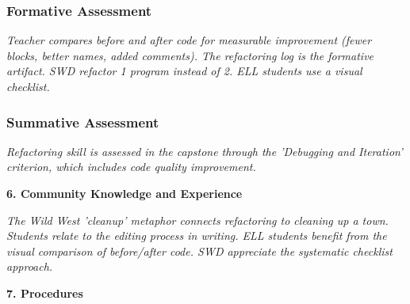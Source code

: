 \documentclass[11pt,letterpaper]{article}
\begin{document}
\subsubsection{Formative Assessment}

\textit{Teacher compares before and after code for measurable improvement (fewer blocks, better names, added comments). The refactoring log is the formative artifact. SWD refactor 1 program instead of 2. ELL students use a visual checklist.}

\subsubsection{Summative Assessment}

\textit{Refactoring skill is assessed in the capstone through the 'Debugging and Iteration' criterion, which includes code quality improvement.}

\textbf{6. Community Knowledge and Experience}

\textit{The Wild West 'cleanup' metaphor connects refactoring to cleaning up a town. Students relate to the editing process in writing. ELL students benefit from the visual comparison of before/after code. SWD appreciate the systematic checklist approach.}

\textbf{7. Procedures}
\end{document}

